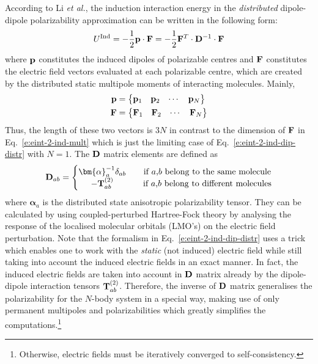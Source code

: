 \documentclass[a4paper,titlepage,twoside,fleqn,12pt]{book}
\newcommand{\BM}[1]{\bm{#1}}
\begin{document}
\begin{refsection}
According to Li \emph{et al.}, \citep{Li.Netzloff.Gordon.JCP.2006} 
the induction interaction energy in the 
\emph{distributed} dipole\hyp{}dipole polarizability approximation 
can be written in the following form:
%
\begin{equation} \label{e:eint-2-ind-dip-distr}
U^{\rm Ind} = - \frac{1}{2} {\bf p} \cdot {\bf F} = - \frac{1}{2} {\bf F}^T \cdot {\bf D}^{-1} \cdot {\bf F}
\end{equation}
%
where ${\bf p}$ constitutes the induced dipoles of 
polarizable centres and ${\bf F}$ constitutes the electric field 
vectors evaluated at each polarizable centre, which are created by the 
distributed static multipole moments of interacting molecules.
Mainly,
%
\begin{subequations} \label{e:pf}
\begin{align}
 {\bf p} &= 
 \begin{Bmatrix}
  {\bf p}_1 & {\bf p}_2 & \cdots & {\bf p}_N
 \end{Bmatrix} \\
 {\bf F}&= 
 \begin{Bmatrix}
  {\bf F}_1 & {\bf F}_2 & \cdots & {\bf F}_N
 \end{Bmatrix}
\end{align}
\end{subequations}
%
Thus, the length of these two vectors is $3N$ in contrast to the dimension
of $\bf F$ in Eq.~\eqref{e:eint-2-ind-mult} which is just the limiting case of 
Eq.~\eqref{e:eint-2-ind-dip-distr} with $N=1$.
The $\bf D$ matrix elements are defined as
%
\begin{equation} \label{e:D-matrix}
{\bf D}_{ab} = 
\left\{\begin{matrix}               
{\BM \alpha}_a^{-1} \delta_{ab} && \text{if $a$,$b$ belong to the same molecule} \\
-{\bf T}_{ab}^{(2)}             && \text{if $a$,$b$ belong to different molecules}
\end{matrix}\right. 
\end{equation}
%
where ${\BM \alpha}_a$ is the distributed state anisotropic polarizability
tensor. They can be calculated by using coupled\hyp{}perturbed Hartree\hyp{}Fock
theory by analysing the response of the localised molecular orbitals
(LMO's) on the electric field perturbation. Note that the formalism
in Eq.~\eqref{e:eint-2-ind-dip-distr} uses a trick which enables one
to work with the \emph{static} (not induced) electric field while still taking
into account the induced electric fields in an exact manner. In fact,
the induced electric fields are taken into account in $\bf D$ matrix already
by the dipole\hyp{}dipole interaction tensors ${\bf T}_{ab}^{(2)}$.
Therefore, the inverse of $\bf D$ matrix generalises
the polarizability for the $N$-body system in a special way, making use
of only permanent multipoles and polarizabilities which greatly simplifies
the computations.\footnote{Otherwise, electric fields must be iteratively converged to
self\hyp{}consistency.}


\end{refsection}
\end{document}
